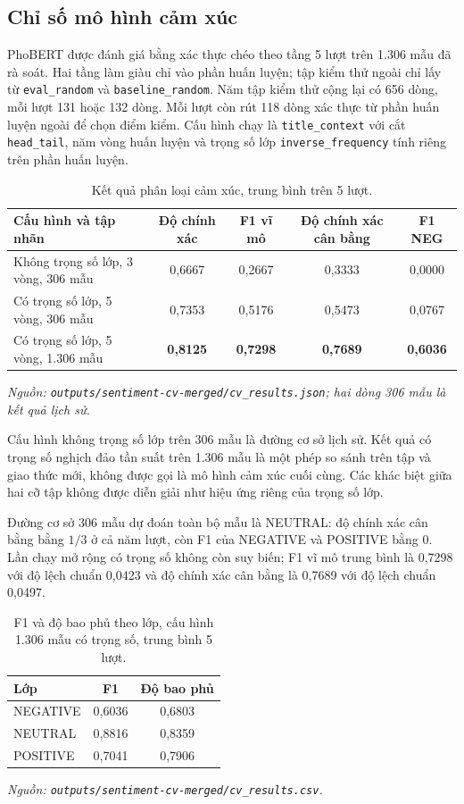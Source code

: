 \subsection{Chỉ số mô hình cảm xúc}
\label{sec:kq-sentiment-metrics}

PhoBERT được đánh giá bằng xác thực chéo theo tầng 5 lượt trên 1.306 mẫu đã rà soát.
Hai tầng làm giàu chỉ vào phần huấn luyện; tập kiểm thử ngoài chỉ lấy từ
\texttt{eval\_random} và \texttt{baseline\_random}. Năm tập kiểm thử cộng lại có 656
dòng, mỗi lượt 131 hoặc 132 dòng. Mỗi lượt còn rút 118 dòng xác thực từ phần huấn luyện
ngoài để chọn điểm kiểm. Cấu hình chạy là \texttt{title\_context} với cắt
\texttt{head\_tail}, năm vòng huấn luyện và trọng số lớp
\texttt{inverse\_frequency} tính riêng trên phần huấn luyện.

\begin{table}[H]
  \centering
  \caption{Kết quả phân loại cảm xúc, trung bình trên 5 lượt.}
  \label{tab:kq-sentiment}
  \begin{tabular}{l c c c c}
    \toprule
    Cấu hình và tập nhãn & Độ chính xác & F1 vĩ mô & Độ chính xác cân bằng & F1 NEG \\
    \midrule
    Không trọng số lớp, 3 vòng, 306 mẫu & 0,6667 & 0,2667 & 0,3333 & 0,0000 \\
    Có trọng số lớp, 5 vòng, 306 mẫu & 0,7353 & 0,5176 & 0,5473 & 0,0767 \\
    Có trọng số lớp, 5 vòng, 1.306 mẫu & \textbf{0,8125} & \textbf{0,7298} & \textbf{0,7689} & \textbf{0,6036} \\
    \bottomrule
  \end{tabular}
\noindent\textit{Nguồn: \texttt{outputs/sentiment-cv-merged/cv\_results.json}; hai dòng 306 mẫu là kết quả lịch sử.}
\end{table}

Cấu hình không trọng số lớp trên 306 mẫu là đường cơ sở lịch sử. Kết quả có trọng số
nghịch đảo tần suất trên 1.306 mẫu là một phép so sánh trên tập và giao thức mới, không
được gọi là mô hình cảm xúc cuối cùng. Các khác biệt giữa hai cỡ tập không được diễn giải
như hiệu ứng riêng của trọng số lớp.

Đường cơ sở 306 mẫu dự đoán toàn bộ mẫu là NEUTRAL: độ chính xác cân bằng bằng $1/3$ ở
cả năm lượt, còn F1 của NEGATIVE và POSITIVE bằng 0. Lần chạy mở rộng có trọng số không
còn suy biến; F1 vĩ mô trung bình là 0,7298 với độ lệch chuẩn 0,0423 và độ chính xác cân
bằng là 0,7689 với độ lệch chuẩn 0,0497.

\begin{table}[H]
  \centering
  \caption{F1 và độ bao phủ theo lớp, cấu hình 1.306 mẫu có trọng số, trung bình 5 lượt.}
  \label{tab:kq-sentiment-class}
  \begin{tabular}{l c c}
    \toprule
    Lớp & F1 & Độ bao phủ \\
    \midrule
    NEGATIVE & 0,6036 & 0,6803 \\
    NEUTRAL & 0,8816 & 0,8359 \\
    POSITIVE & 0,7041 & 0,7906 \\
    \bottomrule
  \end{tabular}
\noindent\textit{Nguồn: \texttt{outputs/sentiment-cv-merged/cv\_results.csv}.}
\end{table}

